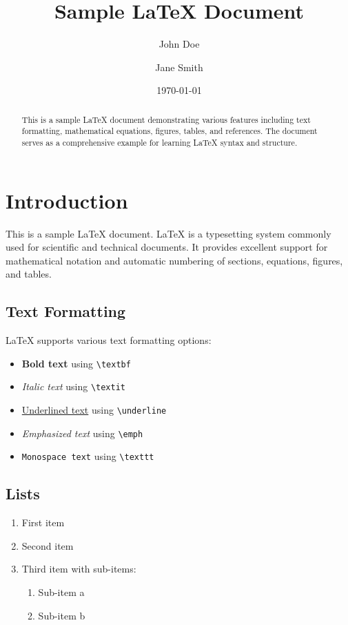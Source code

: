 \documentclass[12pt,a4paper]{article}
\title{Sample LaTeX Document}
\author{John Doe \and Jane Smith}
\date{\today}
\begin{document}
\maketitle

\begin{abstract}
This is a sample LaTeX document demonstrating various features including text formatting, mathematical equations, figures, tables, and references. The document serves as a comprehensive example for learning LaTeX syntax and structure.
\end{abstract}

\tableofcontents

\section{Introduction}

This is a sample \LaTeX{} document. LaTeX is a typesetting system commonly used for scientific and technical documents. It provides excellent support for mathematical notation and automatic numbering of sections, equations, figures, and tables.

\subsection{Text Formatting}

LaTeX supports various text formatting options:
\begin{itemize}
    \item \textbf{Bold text} using \texttt{\textbackslash textbf}
    \item \textit{Italic text} using \texttt{\textbackslash textit}
    \item \underline{Underlined text} using \texttt{\textbackslash underline}
    \item \emph{Emphasized text} using \texttt{\textbackslash emph}
    \item \texttt{Monospace text} using \texttt{\textbackslash texttt}
\end{itemize}

\subsection{Lists}

\begin{enumerate}
    \item First item
    \item Second item
    \item Third item with sub-items:
    \begin{enumerate}
        \item Sub-item a
        \item Sub-item b
    \end{enumerate}
\end{enumerate}
\end{document}
